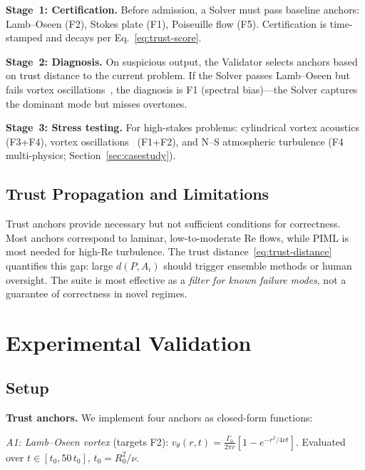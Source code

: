 \documentclass[conference]{IEEEtran}
\begin{document}
\textbf{Stage~1: Certification.} Before admission, a Solver must pass baseline anchors: Lamb--Oseen (F2), Stokes plate (F1), Poiseuille flow (F5). Certification is time-stamped and decays per Eq.~\eqref{eq:trust-score}.

\textbf{Stage~2: Diagnosis.} On suspicious output, the Validator selects anchors based on trust distance to the current problem. If the Solver passes Lamb--Oseen but fails vortex oscillations~\cite{PetrovaShugaev2012}, the diagnosis is F1 (spectral bias)---the Solver captures the dominant mode but misses overtones.

\textbf{Stage~3: Stress testing.} For high-stakes problems: cylindrical vortex acoustics~\cite{PetrovaShugaev2015} (F3+F4), vortex oscillations~\cite{PetrovaShugaev2012} (F1+F2), and N--S atmospheric turbulence (F4 multi-physics; Section~\ref{sec:casestudy}).

\subsection{Trust Propagation and Limitations}

Trust anchors provide necessary but not sufficient conditions for correctness. Most anchors correspond to laminar, low-to-moderate Re flows, while PIML is most needed for high-Re turbulence. The trust distance~\eqref{eq:trust-distance} quantifies this gap: large $d(P, A_i)$ should trigger ensemble methods or human oversight. The suite is most effective as a \emph{filter for known failure modes}, not a guarantee of correctness in novel regimes.


\section{Experimental Validation}
\label{sec:experiments}

\subsection{Setup}

\textbf{Trust anchors.} We implement four anchors as closed-form functions:

\emph{A1: Lamb--Oseen vortex} (targets F2):
$v_\theta(r,t) = \frac{\Gamma_0}{2\pi r}[1 - e^{-r^2/4\nu t}].$
Evaluated over $t \in [t_0, 50\,t_0]$, $t_0 = R_0^2/\nu$.
\end{document}
